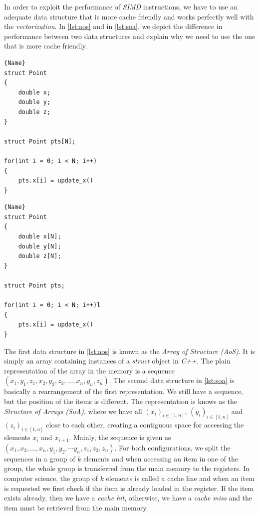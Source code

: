 In order to exploit the performance of \emph{SIMD} instructions, we have to use an adequate data structure that is more cache friendly and works perfectly well with the \emph{vectorization}. In \autoref{lst:aos} and in \autoref{lst:soa}, we depict the difference in performance between two data structures and explain why we need to use the one that is more cache friendly.


\begin{minipage}{.45\textwidth}
\begin{lstlisting}[caption=Array of Structure (AoS),frame=tlrb, label=lst:aos]{Name}
struct Point
{
    double x;
    double y;
    double z;
}

struct Point pts[N];

for(int i = 0; i < N; i++)
{
    pts.x[i] = update_x()
}
\end{lstlisting}
\end{minipage}\hfill
\begin{minipage}{.45\textwidth}
\begin{lstlisting}[caption=Structure of Arrays (SoA),frame=tlrb, label=lst:soa]{Name}
struct Point
{
    double x[N];
    double y[N];
    double z[N];
}

struct Point pts;

for(int i = 0; i < N; i++)l
{
    pts.x[i] = update_x()
}

\end{lstlisting}
\end{minipage}

The first data structure in \autoref{lst:aos} is known as the \emph{Array of Structure (AoS)}. It is simply an array containing instances of a \emph{struct} object in \emph{C++}. The plain representation of the array in the memory is a sequence $(x_1, y_1, z_1, x_2, y_2, z_2, \dots, x_n, y_n, z_n)$. The second data structure in \autoref{lst:soa} is basically a rearrangement of the first representation. We still have a sequence, but the position of the items is different. The representation is knows as the \emph{Structure of Arrays (SoA)}, where we have all $(x_i)_{i \in[1, n]}$, $(y_i)_{i \in[1, n]}$ and $(z_i)_{i \in[1, n]}$ close to each other, creating a contiguous space for accessing the elements $x_i$ and $x_{i+1}$. Mainly, the sequence is given as $(x_1, x_{2}, \dots, x_n, y_1, y_{2}, \cdots y_{n}, z_1, z_2, z_n)$.  For both configurations, we split the sequences in a group of $k$ elements and when accessing an item in one of the group, the whole group is transferred from the main memory to the registers. In computer science, the group of $k$ elements is called a cache line and when an item is requested we first check if the item is already loaded in the register. If the item exists already, then we have a \emph{cache hit}, otherwise, we have a \emph{cache miss} and the item must be retrieved from the main memory.

